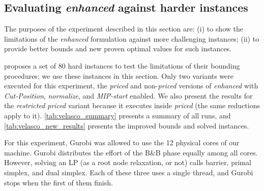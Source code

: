 \documentclass[smallextended]{svjour3}       %
\begin{document}
\subsection{Evaluating \emph{enhanced} against harder instances}
\label{sec:new_results}

The purposes of the experiment described in this section are:
(i) to show the limitations of the \emph{enhanced} formulation against more challenging instances;
(ii) to provide better bounds and new proven optimal values for such instances.

\cite{velasco:2019} proposes a set of 80 hard instances to test the limitations of their bounding procedures; we use these instances in this section.
Only two variants were executed for this experiment, the \emph{priced} and non-\emph{priced} versions of \emph{enhanced} with \emph{Cut-Position}, \emph{normalize}, and \emph{MIP-start} enabled.
We also present the results for the \emph{restricted priced} variant because it executes inside \emph{priced} (the same reductions apply to it).
\autoref{tab:velasco_summary} presents a summary of all runs, and \autoref{tab:velasco_new_results} presents the improved bounds and solved instances.

For this experiment, Gurobi was allowed to use the 12 physical cores of our machine.
Gurobi distributes the effort of the B\&B phase equally among all cores.
However, solving an LP (as a root node relaxation, or not) calls barrier, primal simplex, and dual simplex.
Each of these three uses a single thread, and Gurobi stops when the first of them finish.
\end{document}
